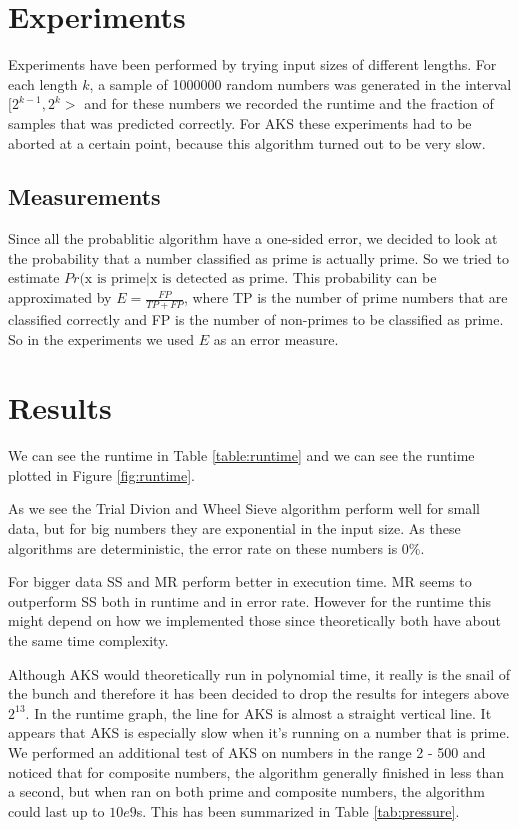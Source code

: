 
\section{Experiments}
\label{sec:experiments}

Experiments have been performed by trying input sizes of different lengths.
For each length $k$, a sample of 1000000 random numbers was generated in the interval $[2^{k-1}, 2^k>$ and for these numbers we recorded the runtime and the fraction of samples that was predicted correctly.
    For AKS these experiments had to be aborted at a certain point, because this algorithm turned out to be very slow.

\subsection{Measurements}
Since all the probablitic algorithm have a one-sided error, we decided to look at the probability that a number classified as prime is actually prime.
So we tried to estimate $Pr(\text{x is prime} | \text{x is detected as prime}$.
This probability can be approximated by $E = \frac{FP}{TP + FP}$, where TP is the number of prime numbers that are classified correctly and FP is the number of non-primes to be classified as prime.
So in the experiments we used $E$ as an error measure.

\section{Results}
\label{sec:results}

We can see the runtime in Table \ref{table:runtime} and we can see the runtime plotted in Figure \ref{fig:runtime}.

As we see the Trial Divion and Wheel Sieve algorithm perform well for small data, but for big numbers they are exponential in the input size.
As these algorithms are deterministic, the error rate on these numbers is $0\%$.

For bigger data SS and MR perform better in execution time.
MR seems to outperform SS both in runtime and in error rate.
However for the runtime this might depend on how we implemented those since theoretically both have about the same time complexity.

Although AKS would theoretically run in polynomial time, it really is the snail of the bunch and therefore it has been decided to drop the results for integers above $2^{13}$.
In the runtime graph, the line for AKS is almost a straight vertical line.
It appears that AKS is especially slow when it's running on a number that is prime.
We performed an additional test of AKS on numbers in the range 2 - 500 and noticed that for composite numbers, the algorithm generally finished in less than a second, but when ran on both prime and composite numbers, the algorithm could last up to $10e9$s.
This has been summarized in Table \ref{tab:pressure}.

